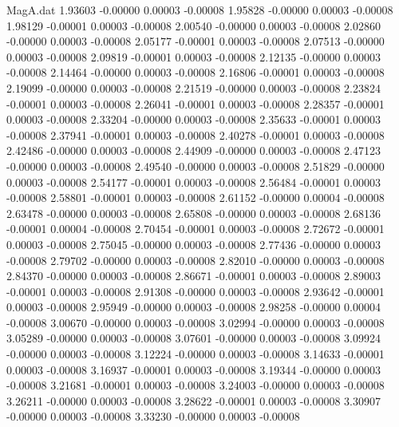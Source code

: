 \begin{filecontents}{MagA.dat}
   1.93603   -0.00000    0.00003   -0.00008
   1.95828   -0.00000    0.00003   -0.00008
   1.98129   -0.00001    0.00003   -0.00008
   2.00540   -0.00000    0.00003   -0.00008
   2.02860   -0.00000    0.00003   -0.00008
   2.05177   -0.00001    0.00003   -0.00008
   2.07513   -0.00000    0.00003   -0.00008
   2.09819   -0.00001    0.00003   -0.00008
   2.12135   -0.00000    0.00003   -0.00008
   2.14464   -0.00000    0.00003   -0.00008
   2.16806   -0.00001    0.00003   -0.00008
   2.19099   -0.00000    0.00003   -0.00008
   2.21519   -0.00000    0.00003   -0.00008
   2.23824   -0.00001    0.00003   -0.00008
   2.26041   -0.00001    0.00003   -0.00008
   2.28357   -0.00001    0.00003   -0.00008
   2.33204   -0.00000    0.00003   -0.00008
   2.35633   -0.00001    0.00003   -0.00008
   2.37941   -0.00001    0.00003   -0.00008
   2.40278   -0.00001    0.00003   -0.00008
   2.42486   -0.00000    0.00003   -0.00008
   2.44909   -0.00000    0.00003   -0.00008
   2.47123   -0.00000    0.00003   -0.00008
   2.49540   -0.00000    0.00003   -0.00008
   2.51829   -0.00000    0.00003   -0.00008
   2.54177   -0.00001    0.00003   -0.00008
   2.56484   -0.00001    0.00003   -0.00008
   2.58801   -0.00001    0.00003   -0.00008
   2.61152   -0.00000    0.00004   -0.00008
   2.63478   -0.00000    0.00003   -0.00008
   2.65808   -0.00000    0.00003   -0.00008
   2.68136   -0.00001    0.00004   -0.00008
   2.70454   -0.00001    0.00003   -0.00008
   2.72672   -0.00001    0.00003   -0.00008
   2.75045   -0.00000    0.00003   -0.00008
   2.77436   -0.00000    0.00003   -0.00008
   2.79702   -0.00000    0.00003   -0.00008
   2.82010   -0.00000    0.00003   -0.00008
   2.84370   -0.00000    0.00003   -0.00008
   2.86671   -0.00001    0.00003   -0.00008
   2.89003   -0.00001    0.00003   -0.00008
   2.91308   -0.00000    0.00003   -0.00008
   2.93642   -0.00001    0.00003   -0.00008
   2.95949   -0.00000    0.00003   -0.00008
   2.98258   -0.00000    0.00004   -0.00008
   3.00670   -0.00000    0.00003   -0.00008
   3.02994   -0.00000    0.00003   -0.00008
   3.05289   -0.00000    0.00003   -0.00008
   3.07601   -0.00000    0.00003   -0.00008
   3.09924   -0.00000    0.00003   -0.00008
   3.12224   -0.00000    0.00003   -0.00008
   3.14633   -0.00001    0.00003   -0.00008
   3.16937   -0.00001    0.00003   -0.00008
   3.19344   -0.00000    0.00003   -0.00008
   3.21681   -0.00001    0.00003   -0.00008
   3.24003   -0.00000    0.00003   -0.00008
   3.26211   -0.00000    0.00003   -0.00008
   3.28622   -0.00001    0.00003   -0.00008
   3.30907   -0.00000    0.00003   -0.00008
   3.33230   -0.00000    0.00003   -0.00008

\end{filecontents}

